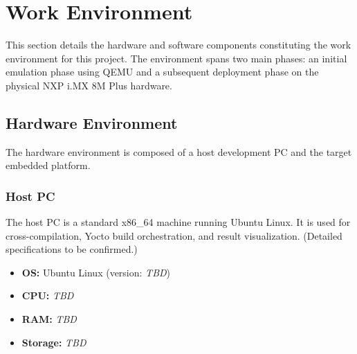 
\section{Work Environment}
This section details the hardware and software components constituting the work environment for this project. The environment spans two main phases: an initial emulation phase using QEMU and a subsequent deployment phase on the physical NXP i.MX 8M Plus hardware.

\subsection{Hardware Environment}
The hardware environment is composed of a host development PC and the target embedded platform.

\subsubsection{Host PC}
The host PC is a standard x86\_64 machine running Ubuntu Linux. It is used for cross-compilation, Yocto build orchestration, and result visualization. (Detailed specifications to be confirmed.)
\begin{itemize}
    \item \textbf{OS:} Ubuntu Linux (version: \textit{TBD})
    \item \textbf{CPU:} \textit{TBD}
    \item \textbf{RAM:} \textit{TBD}
    \item \textbf{Storage:} \textit{TBD}
\end{itemize}

